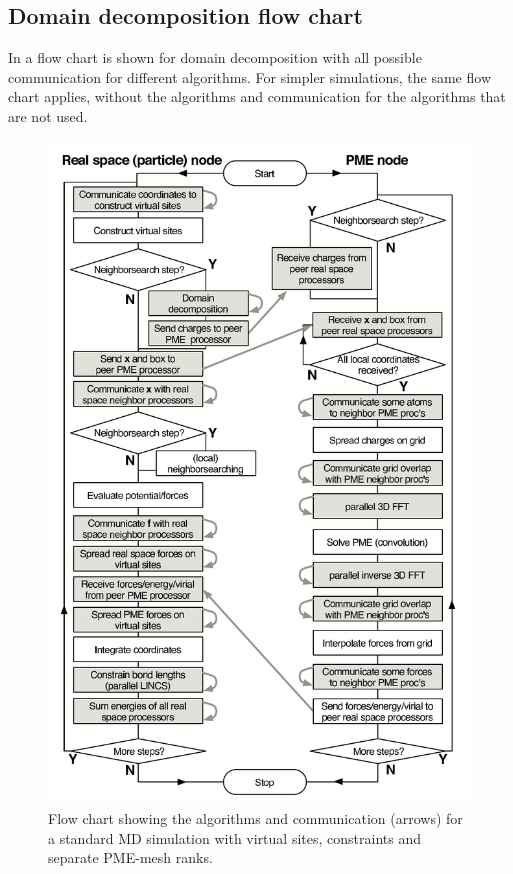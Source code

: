 \subsection{Domain decomposition flow chart}
In  a flow chart is shown for domain decomposition
with all possible communication for different algorithms.
For simpler simulations, the same flow chart applies,
without the algorithms and communication for
the algorithms that are not used.

\begin{figure}
\centerline{\includegraphics[width=12cm]{plots/flowchart}}
\caption{
Flow chart showing the algorithms and communication (arrows)
for a standard MD simulation with virtual sites, constraints
and separate PME-mesh ranks.
\label{fig:dd_flow}
}
\end{figure}


